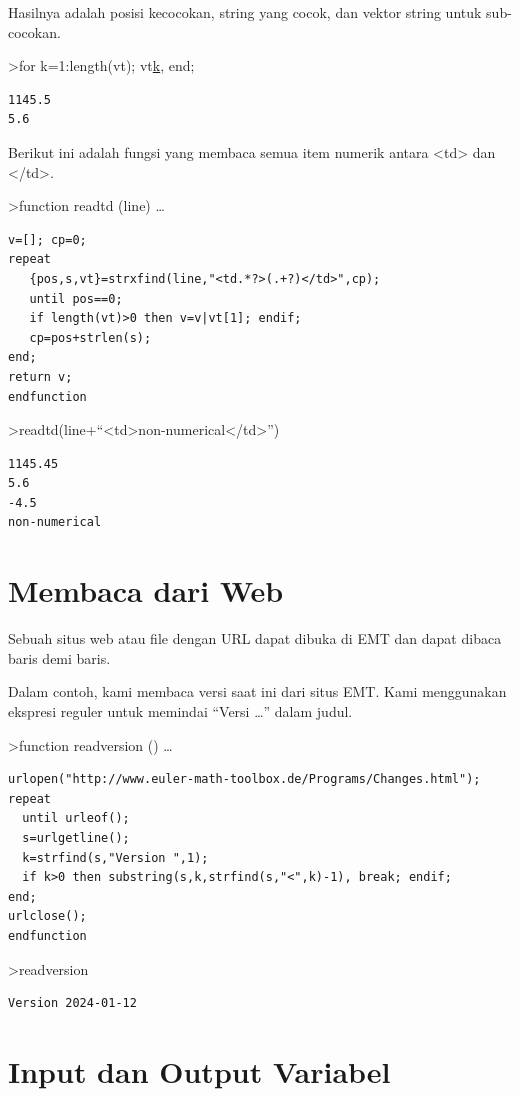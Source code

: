 \documentclass[
]{book}
\begin{document}
Hasilnya adalah posisi kecocokan, string yang cocok, dan vektor string untuk sub-cocokan.

\textgreater for k=1:length(vt); vt\href{}{k}, end;

\begin{verbatim}
1145.5
5.6
\end{verbatim}

Berikut ini adalah fungsi yang membaca semua item numerik antara \textless td\textgreater{} dan \textless/td\textgreater.

\textgreater function readtd (line) \ldots{}

\begin{verbatim}
v=[]; cp=0;
repeat
   {pos,s,vt}=strxfind(line,"<td.*?>(.+?)</td>",cp);
   until pos==0;
   if length(vt)>0 then v=v|vt[1]; endif;
   cp=pos+strlen(s);
end;
return v;
endfunction
\end{verbatim}

\textgreater readtd(line+``\textless td\textgreater non-numerical\textless/td\textgreater{}'')

\begin{verbatim}
1145.45
5.6
-4.5
non-numerical
\end{verbatim}

\chapter{Membaca dari Web}\label{membaca-dari-web}

Sebuah situs web atau file dengan URL dapat dibuka di EMT dan dapat dibaca baris demi baris.

Dalam contoh, kami membaca versi saat ini dari situs EMT. Kami menggunakan ekspresi reguler untuk memindai ``Versi \ldots{}'' dalam judul.

\textgreater function readversion () \ldots{}

\begin{verbatim}
urlopen("http://www.euler-math-toolbox.de/Programs/Changes.html");
repeat
  until urleof();
  s=urlgetline();
  k=strfind(s,"Version ",1);
  if k>0 then substring(s,k,strfind(s,"<",k)-1), break; endif;
end;
urlclose();
endfunction
\end{verbatim}

\textgreater readversion

\begin{verbatim}
Version 2024-01-12
\end{verbatim}

\chapter{Input dan Output Variabel}\label{input-dan-output-variabel}
\end{document}
